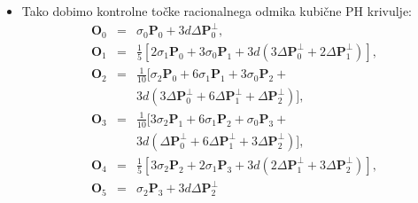\documentclass[12pt]{beamer}
\theoremstyle{definition} %
\theoremstyle{plain} %
\begin{document}
    \begin{frame}
        \begin{itemize}
            \item Tako dobimo kontrolne točke racionalnega odmika kubične PH krivulje:
                \begin{eqnarray}
                    \textbf{O}_0 &=& \sigma_0 \textbf{P}_0 + 3 d \Delta \textbf{P}_0^{\perp},\nonumber \\
                    \textbf{O}_1 &=& \frac{1}{5} [2 \sigma_1 \textbf{P}_0 + 3\sigma_0 \textbf{P}_1 + 3 d (3 \Delta \textbf{P}_0^{\perp} + 2 \Delta \textbf{P}_1^{\perp})],\nonumber \\
                    \textbf{O}_2 &=& \frac{1}{10} [\sigma_2 \textbf{P}_0 + 6\sigma_1 \textbf{P}_1 + 3\sigma_0 \textbf{P}_2 + \nonumber \\
                        & & 3 d (3 \Delta \textbf{P}_0^{\perp} + 6 \Delta \textbf{P}_1^{\perp} + \Delta \textbf{P}_2^{\perp})],\nonumber \\
                    \textbf{O}_3 &=& \frac{1}{10} [3\sigma_2 \textbf{P}_1 + 6\sigma_1 \textbf{P}_2 + \sigma_0 \textbf{P}_3 + \nonumber \\
                        & & 3 d (\Delta \textbf{P}_0^{\perp} + 6 \Delta \textbf{P}_1^{\perp} + 3 \Delta \textbf{P}_2^{\perp})],\nonumber \\
                    \textbf{O}_4 &=& \frac{1}{5} [3\sigma_2 \textbf{P}_2 + 2\sigma_1 \textbf{P}_3 + 3 d (2\Delta \textbf{P}_1^{\perp} + 3 \Delta \textbf{P}_2^{\perp})],\nonumber \\
                    \textbf{O}_5 &=& \sigma_2 \textbf{P}_3 + 3 d \Delta \textbf{P}_2^{\perp}\nonumber
                \end{eqnarray}
                
        \end{itemize}
    \end{frame}
\end{document}
